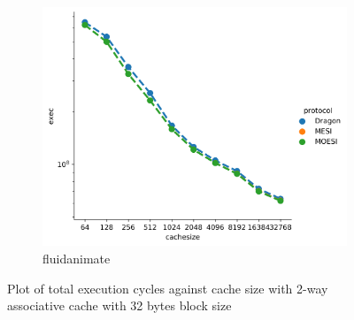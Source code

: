 \documentclass[nonacm,acmsmall,screen,11pt]{acmart}
\begin{document}
\begin{figure}[htb!]
  \begin{subfigure}{0.32\textwidth}
    \includegraphics[width=\columnwidth]{cachesize-fluidanimate}
    \caption{fluidanimate}
  \end{subfigure}
  \caption{Plot of total execution cycles against cache size with 2-way associative cache with 32 bytes block size}
  \label{fig:cachesize}
\end{figure}



\end{document}
